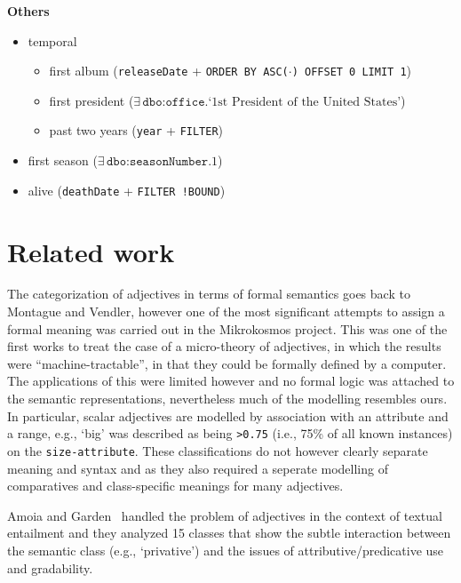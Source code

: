 \documentclass[11pt]{article}
\begin{document}
\textbf{Others}

\begin{itemize}
\item temporal
 \begin{itemize}
 \item first album (\texttt{releaseDate} + \texttt{ORDER BY ASC($\cdot$) OFFSET 0 LIMIT 1})
 \item first president ($\exists\,\texttt{dbo:office}.\text{`1st President of the United States'}$)
 \item past two years (\texttt{year} + \texttt{FILTER})
 \end{itemize}
\item first season ($\exists\,\texttt{dbo:seasonNumber}.1$)
\item alive (\texttt{deathDate} + \texttt{FILTER !BOUND})
\end{itemize}



\section{Related work}

The categorization of adjectives in terms of formal semantics goes back to Montague and Vendler, however one of the most significant attempts to assign a formal meaning was carried out in the Mikrokosmos project\cite{raskin1995lexical}. This was one of the first works to treat the case of a micro-theory of adjectives, in which the results were ``machine-tractable'', in that they could be formally defined by a computer. The applications of this were limited however and no formal logic was attached to the semantic representations, nevertheless much of the modelling resembles ours. In particular, scalar adjectives are modelled by association with an attribute and a range, e.g., `big' was described as being {\tt >0.75} (i.e., 75\% of all known instances) on the {\tt size-attribute}. These classifications do not however clearly separate meaning and syntax and as they also required a seperate modelling of comparatives and class-specific meanings for many adjectives.

Amoia and Garden~ handled the problem of adjectives in the context of textual entailment and they analyzed 15 classes that show the subtle interaction between the semantic class (e.g., `privative') and the issues of attributive/predicative use and gradability. 
\end{document}
